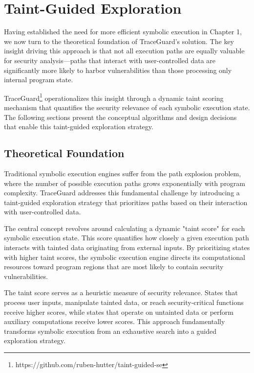 \chapter{Taint-Guided Exploration}


Having established the need for more efficient symbolic execution in Chapter 1, we now turn to the theoretical foundation of TraceGuard's solution. The key insight driving this approach is that not all execution paths are equally valuable for security analysis—paths that interact with user-controlled data are significantly more likely to harbor vulnerabilities than those processing only internal program state.

TraceGuard\footnote{https://github.com/ruben-hutter/taint-guided-se} operationalizes this insight through a dynamic taint scoring mechanism that quantifies the security relevance of each symbolic execution state. The following sections present the conceptual algorithms and design decisions that enable this taint-guided exploration strategy.

\section{Theoretical Foundation}

Traditional symbolic execution engines suffer from the path explosion problem, where the number of possible execution paths grows exponentially with program complexity. TraceGuard addresses this fundamental challenge by introducing a taint-guided exploration strategy that prioritizes paths based on their interaction with user-controlled data.

The central concept revolves around calculating a dynamic "taint score" for each symbolic execution state. This score quantifies how closely a given execution path interacts with tainted data originating from external inputs. By prioritizing states with higher taint scores, the symbolic execution engine directs its computational resources toward program regions that are most likely to contain security vulnerabilities.

The taint score serves as a heuristic measure of security relevance. States that process user inputs, manipulate tainted data, or reach security-critical functions receive higher scores, while states that operate on untainted data or perform auxiliary computations receive lower scores. This approach fundamentally transforms symbolic execution from an exhaustive search into a guided exploration strategy.


